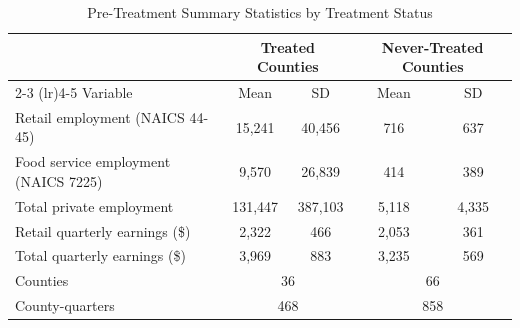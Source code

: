 \begin{table}[t]
\centering
\caption{Pre-Treatment Summary Statistics by Treatment Status}
\label{tab:summary}
\begin{tabular}{lcccc}
\hline\hline
 & \multicolumn{2}{c}{Treated Counties} & \multicolumn{2}{c}{Never-Treated Counties} \\
\cmidrule(lr){2-3} \cmidrule(lr){4-5}
Variable & Mean & SD & Mean & SD \\
\hline
Retail employment (NAICS 44-45) & 15,241 & 40,456 & 716 & 637 \\
Food service employment (NAICS 7225) & 9,570 & 26,839 & 414 & 389 \\
Total private employment & 131,447 & 387,103 & 5,118 & 4,335 \\
Retail quarterly earnings (\$) & 2,322 & 466 & 2,053 & 361 \\
Total quarterly earnings (\$) & 3,969 & 883 & 3,235 & 569 \\
\hline
Counties & \multicolumn{2}{c}{36} & \multicolumn{2}{c}{66} \\
County-quarters & \multicolumn{2}{c}{468} & \multicolumn{2}{c}{858} \\
\hline\hline
\end{tabular}
\par{}
\end{table}
